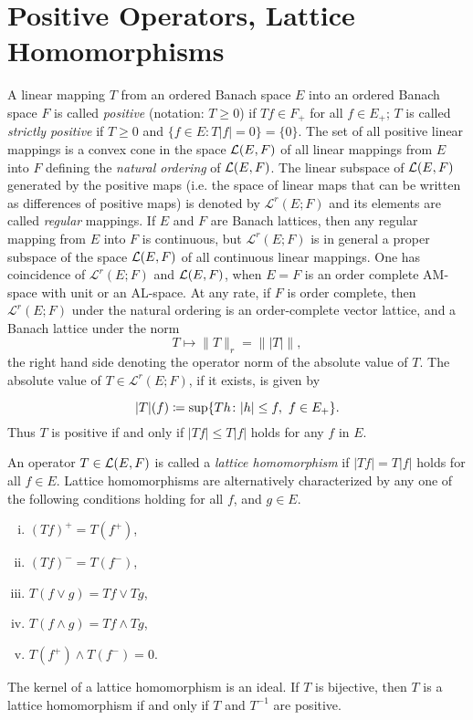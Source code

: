 \section{Positive Operators, Lattice Homomorphisms}\label{sec:c1-6}
A linear mapping $ T $ from an ordered Banach space $ E $ into an ordered Banach space $ F $ is called \emph{positive} (notation: $ T \geq 0 $) if $ Tf \in F_{+} $ for all $ f \in E_{+} $; $ T $ is called \emph{strictly positive} if $ T \geq 0 $ and $ \{f \in E \colon T|f| = 0\} = \{0\} $.
The set of all positive linear mappings is a convex cone in the space $ \mathcal{L}(E,F) $ of all linear mappings from $ E $ into $ F $ defining the \emph{natural ordering} of $ \mathcal{L}(E,F) $.
The linear subspace of $ \mathcal{L}(E,F) $ generated by the positive maps (i.e. the space of linear maps that can be written as differences of positive maps) is denoted by $ \mathcal{L}^{r}(E;F) $ and its elements are called \emph{regular} mappings.
If $ E $ and $ F $ are Banach lattices, then any regular mapping from $ E $ into $ F $ is continuous, but  $ \mathcal{L}^{r}(E;F) $ is in general a proper subspace of the space $ \mathcal{L}(E,F) $ of all continuous linear mappings.
One has coincidence of $ \mathcal{L}^{r}(E;F) $ and $ \mathcal{L}(E,F) $, \eg when $ E = F $ is an order complete AM-space with unit or an AL-space.
At any rate, if $ F $ is order complete, then $ \mathcal{L}^{r}(E;F) $ under the natural ordering is an order-complete vector lattice, and a Banach lattice under the norm
\[
	T \mapsto \|T\|_{r} = \| |T| \|,
\]
the right hand side denoting the operator norm of the absolute value of $ T $.
The absolute value of $ T \in  \mathcal{L}^{r}(E;F) $, if it exists, is given by

\[
	|T|(f) \coloneqq \sup\{ Th \colon |h| \leq f , \text{ $ f \in E_{+} $} \} . 
\]
Thus $ T $ is positive if and only if $ |Tf| \leq T|f| $ holds for any $ f $ in $ E $.

An operator $ T \in \mathcal{L}(E,F) $ is called a \emph{lattice homomorphism} if $ |Tf| = T|f| $ holds for all $ f \in E $.
Lattice homomorphisms are alternatively characterized by any one of the following conditions holding for all $ f $, and $ g \in E $.
\begin{enumerate}[(i)]

    \item 
    $(Tf)^{+} = T(f^{+})$,
    
    \item 
    $(Tf)^{-} = T(f^{-})$,
    
    \item 
    $T(f\vee g) = Tf\vee Tg$,
    
    \item 
    $T(f\wedge g) = Tf\wedge Tg$,
    
    \item 
    $T(f^{+})\wedge T(f^{-}) = 0$.

\end{enumerate}
The kernel of a lattice homomorphism is an ideal.
If $ T $ is bijective, then $ T $ is a lattice homomorphism if and only if $ T $ and $ T^{-1} $ are positive.
